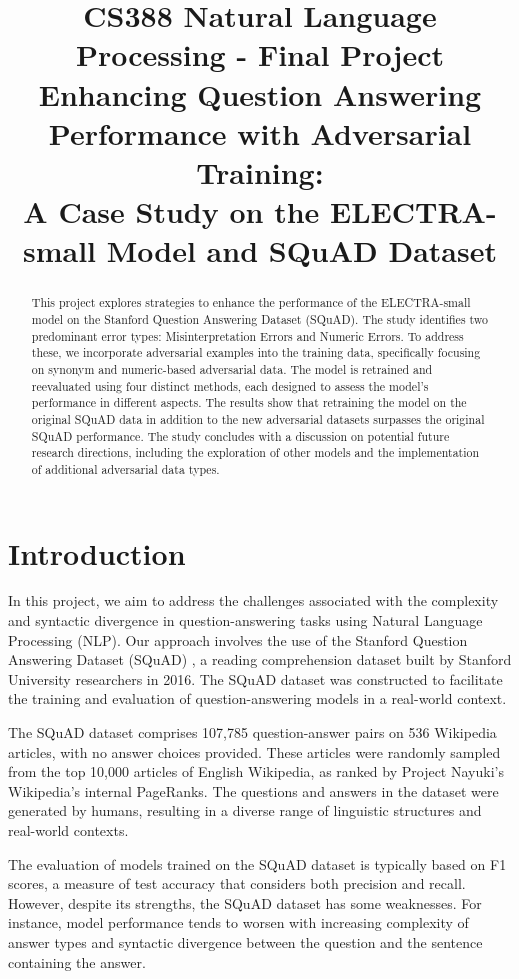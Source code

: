 \documentclass{article}
\title{\small CS388 Natural Language Processing - Final Project\\
\large Enhancing Question Answering Performance with Adversarial Training:\\
A Case Study on the ELECTRA-small Model and SQuAD Dataset}
\begin{document}
\maketitle

\begin{abstract}
This project explores strategies to enhance the performance of the ELECTRA-small
model on the Stanford Question Answering Dataset (SQuAD). The study identifies
two predominant error types: Misinterpretation Errors and Numeric Errors. To
address these, we incorporate adversarial examples into the training data,
specifically focusing on synonym and numeric-based adversarial data. The model
is retrained and reevaluated using four distinct methods, each designed to assess
the model's performance in different aspects. The results show that retraining
the model on the original SQuAD data in addition to the new adversarial datasets
surpasses the original SQuAD performance. The study concludes with a discussion
on potential future research directions, including the exploration of other models
and the implementation of additional adversarial data types.
\end{abstract}

\section{Introduction}

In this project, we aim to address the challenges associated with the complexity
and syntactic divergence in question-answering tasks using Natural Language
Processing (NLP). Our approach involves the use of the Stanford Question Answering
Dataset (SQuAD) \cite{rajpurkar2016squad}, a reading comprehension dataset built by
Stanford University researchers in 2016. The SQuAD dataset was constructed to
facilitate the training and evaluation of question-answering models in a real-world
context.

The SQuAD dataset comprises 107,785 question-answer pairs on 536 Wikipedia articles,
with no answer choices provided. These articles were randomly sampled from the top
10,000 articles of English Wikipedia, as ranked by Project Nayuki's Wikipedia's
internal PageRanks. The questions and answers in the dataset were generated by
humans, resulting in a diverse range of linguistic structures and real-world contexts.

The evaluation of models trained on the SQuAD dataset is typically based on F1 scores,
a measure of test accuracy that considers both precision and recall. However, despite
its strengths, the SQuAD dataset has some weaknesses. For instance, model performance
tends to worsen with increasing complexity of answer types and syntactic divergence
between the question and the sentence containing the answer.
\end{document}
